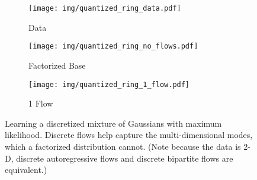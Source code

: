 \documentclass{article}
\begin{document}
\begin{figure}[t!]
\centering
\begin{subfigure}[t]{0.3\textwidth}
\centering
\texttt{[image: img/quantized\_ring\_data.pdf]}
\caption{Data}
\end{subfigure}\hfill \begin{subfigure}[t]{0.3\textwidth}
\centering
\texttt{[image: img/quantized\_ring\_no\_flows.pdf]}
\caption{Factorized Base}
\end{subfigure}\hfill \begin{subfigure}[t]{0.3\textwidth}
\centering
\texttt{[image: img/quantized\_ring\_1\_flow.pdf]}
\caption{1 Flow}
\end{subfigure}
\caption{Learning a discretized mixture of Gaussians with maximum likelihood. Discrete flows help capture the multi-dimensional modes, which a factorized distribution cannot. (Note because the data is 2-D, discrete autoregressive flows and discrete bipartite flows are equivalent.)}
\label{fig:flow-mixtures}
\end{figure}
\end{document}
